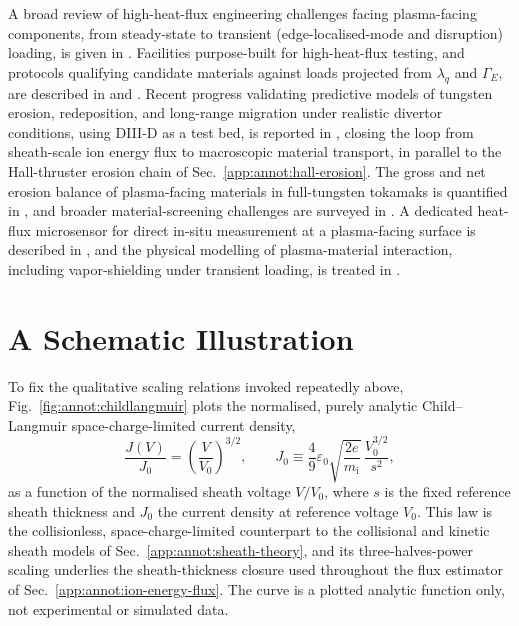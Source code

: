 A broad review of high-heat-flux engineering challenges facing plasma-facing components, from steady-state to transient (edge-localised-mode and disruption) loading, is given in \cite{ref0581}. Facilities purpose-built for high-heat-flux testing, and protocols qualifying candidate materials against loads projected from $\lambda_{q}$ and $\Gamma_{E}$, are described in \cite{ref0586} and \cite{ref0588}. Recent progress validating predictive models of tungsten erosion, redeposition, and long-range migration under realistic divertor conditions, using DIII-D as a test bed, is reported in \cite{ref0593}, closing the loop from sheath-scale ion energy flux to macroscopic material transport, in parallel to the Hall-thruster erosion chain of Sec.~\ref{app:annot:hall-erosion}. The gross and net erosion balance of plasma-facing materials in full-tungsten tokamaks is quantified in \cite{ref0158}, and broader material-screening challenges are surveyed in \cite{ref0190}. A dedicated heat-flux microsensor for direct in-situ measurement at a plasma-facing surface is described in \cite{ref0175}, and the physical modelling of plasma-material interaction, including vapor-shielding under transient loading, is treated in \cite{ref0176}.

\section{A Schematic Illustration}
\label{app:annot:figure}

To fix the qualitative scaling relations invoked repeatedly above, Fig.~\ref{fig:annot:childlangmuir} plots the normalised, purely analytic Child--Langmuir space-charge-limited current density,
\begin{equation}
\frac{J(V)}{J_{0}} = \left(\frac{V}{V_{0}}\right)^{3/2},
\qquad
J_{0} \equiv \frac{4}{9}\varepsilon_{0}\sqrt{\frac{2e}{m_{\mathrm{i}}}}\,\frac{V_{0}^{3/2}}{s^{2}},
\label{eq:annot:childlangmuir}
\end{equation}
as a function of the normalised sheath voltage $V/V_{0}$, where $s$ is the fixed reference sheath thickness and $J_{0}$ the current density at reference voltage $V_{0}$. This law is the collisionless, space-charge-limited counterpart to the collisional and kinetic sheath models of Sec.~\ref{app:annot:sheath-theory}, and its three-halves-power scaling underlies the sheath-thickness closure used throughout the flux estimator of Sec.~\ref{app:annot:ion-energy-flux}. The curve is a plotted analytic function only, not experimental or simulated data.

